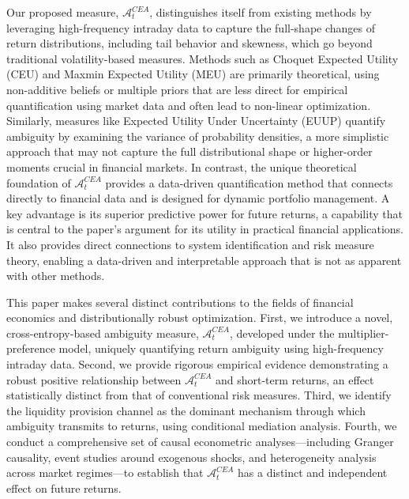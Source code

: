 \documentclass[preprint,12pt,authoryear]{elsarticle}
\renewcommand{\textcolor}[2]{\begingroup\color{#1}#2\endgroup}
\begin{document}
Our proposed measure, $\mathcal{A}^{CEA}_t$, distinguishes itself from existing methods by leveraging high-frequency intraday data to capture the full-shape changes of return distributions, including tail behavior and skewness, which go beyond traditional volatility-based measures. Methods such as Choquet Expected Utility (CEU)  and Maxmin Expected Utility (MEU)  are primarily theoretical, using non-additive beliefs or multiple priors that are less direct for empirical quantification using market data and often lead to non-linear optimization. Similarly, measures like Expected Utility Under Uncertainty (EUUP)  quantify ambiguity by examining the variance of probability densities, a more simplistic approach that may not capture the full distributional shape or higher-order moments crucial in financial markets. In contrast, the unique theoretical foundation of $\mathcal{A}^{CEA}_t$ provides a data-driven quantification method that connects directly to financial data and is designed for dynamic portfolio management. A key advantage is its superior predictive power for future returns, a capability that is central to the paper's argument for its utility in practical financial applications. It also provides direct connections to system identification and risk measure theory, enabling a data-driven and interpretable approach that is not as apparent with other methods.

\par

\textcolor{red}{This paper makes several distinct contributions to the fields of financial economics and distributionally robust optimization. First, we introduce a novel, cross-entropy-based ambiguity measure, $\mathcal{A}^{CEA}_t$, developed under the multiplier-preference model, uniquely quantifying return ambiguity using high-frequency intraday data. Second, we provide rigorous empirical evidence demonstrating a robust positive relationship between $\mathcal{A}^{CEA}_t$ and short-term returns, an effect statistically distinct from that of conventional risk measures. Third, we identify the liquidity provision channel as the dominant mechanism through which ambiguity transmits to returns, using conditional mediation analysis. Fourth, we conduct a comprehensive set of causal econometric analyses---including Granger causality, event studies around exogenous shocks, and heterogeneity analysis across market regimes---to establish that $\mathcal{A}^{CEA}_t$ has a distinct and independent effect on future returns.}
\end{document}
